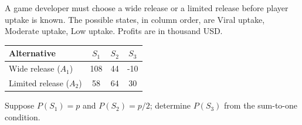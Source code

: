 \clearpage
{}
A game developer must choose a wide release or a limited release before player uptake is known. The possible states, in column order, are Viral uptake, Moderate uptake, Low uptake. Profits are in thousand USD.
\begin{center}
\begin{tabular}{@{}lccc@{}}\toprule
Alternative & $S_1$ & $S_2$ & $S_3$\\\midrule
Wide release ($A_1$) & 108 & 44 & -10\\
Limited release ($A_2$) & 58 & 64 & 30\\
\bottomrule\end{tabular}
\end{center}
Suppose $P(S_1)=p$ and $P(S_2)=p/2$; determine $P(S_3)$ from the sum-to-one condition.
